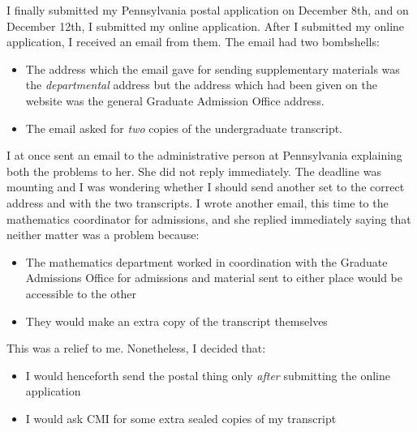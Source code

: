 \documentclass[a4paper]{amsart}
\begin{document}
I finally submitted my Pennsylvania postal application on December
8th, and on December 12th, I submitted my online application. After I
submitted my online application, I received an email from them. The
email had two bombshells:

\begin{itemize}

\item The address which the email gave for sending supplementary
  materials was the {\em departmental} address but the address which
  had been given on the website was the general Graduate Admission Office
  address.

\item The email asked for {\em two} copies of the undergraduate transcript.

\end{itemize}

I at once sent an email to the administrative person at Pennsylvania
explaining both the problems to her. She did not reply immediately.
The deadline was mounting and I was wondering whether I should send
another set to the correct address and with the two transcripts. I wrote
another email, this time to the mathematics coordinator
for admissions, and she replied immediately saying that neither matter
was a problem because:

\begin{itemize}

\item The mathematics department worked in coordination with the
  Graduate Admissions Office for admissions and material sent to either place
  would be accessible to the other

\item They would make an extra copy of the transcript themselves

\end{itemize}

This was a relief to me. Nonetheless, I decided that:

\begin{itemize}

\item I would henceforth send the postal thing only {\em after}
  submitting the online application

\item I would ask CMI for some extra sealed copies of my transcript

\end{itemize}
\end{document}
